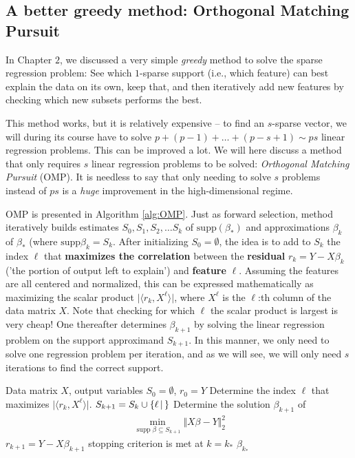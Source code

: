 \documentclass{article}
\DeclareMathOperator{\supp}{\mathrm{supp}}
\newcommand{\sprod}[1]{\langle #1 \rangle}
\newcommand{\sse}{\subseteq}
\newcommand{\set}[2]{\{ #1 \, \vert \, #2\}}
\newcommand{\abs}[1]{\vert #1 \vert}
\newcommand{\norm}[1]{\Vert #1 \Vert}
\begin{document}
\subsection{A better greedy method: Orthogonal Matching Pursuit}
In Chapter $2$, we discussed a very simple \emph{greedy} method to solve the sparse regression problem: See which $1$-sparse support (i.e., which feature) can best explain the data on its own, keep that, and then iteratively add new features by checking which new subsets performs the best.

This method works, but it is relatively expensive -- to find an $s$-sparse vector, we will during its course have to solve $p+(p-1)+\dots + (p-s+1) \sim ps$ linear regression problems. This can be improved a lot. We will here discuss a method that only requires $s$ linear regression problems to be solved: \emph{Orthogonal Matching Pursuit} (OMP). It is needless to say that only needing to solve $s$ problems instead of $ps$ is a \emph{huge} improvement in the high-dimensional regime.


OMP is presented in Algorithm \ref{alg:OMP}. Just as forward selection, method iteratively builds estimates $S_0,S_1,S_2, \dots S_k$ of $\mathrm{supp }(\beta_*)$ and approximations $\beta_k$ of $\beta_*$ (where $\mathrm{supp} \beta_k = S_k$. After initializing $S_0=\emptyset$, the idea is to add to $S_k$ the index  $\ell$ that \textbf{maximizes the correlation} between the \textbf{residual} $r_k=Y-X\beta_k$ ('the portion of output left to explain') and \textbf{feature} $\ell$. Assuming the features are all centered and normalized, this can be expressed mathematically as maximizing the scalar product $\abs{\sprod{r_k,X^\ell}}$, where $X^\ell$ is the $\ell$:th column of the data matrix $X$. Note that checking for which $\ell$ the scalar product is largest is very cheap! One thereafter determines $\beta_{k+1}$ by solving the linear regression problem on the support approximand $S_{k+1}$. In this manner, we only need to solve one regression problem per iteration, and as we will see, we will only need $s$ iterations to find the correct support. 

\begin{algorithm}[tb]      
	\caption{(OMP)} 
	\label{alg:OMP}
	\begin{algorithmic} [1]
 		\REQUIRE Data matrix $X$,  output variables
 		\STATE $S_0=\emptyset$, $r_0 = Y$
 		\REPEAT
 			\STATE Determine the index $\ell$ that maximizes $\abs{\sprod{r_k, X^\ell}}$.
            \STATE $S_{k+1} = S_k \cup \set{\ell}$
            \STATE Determine the solution $\beta_{k+1}$ of 
            \begin{align}
                \min_{\supp \beta \sse S_{k+1}} \norm{X\beta - Y}_2^2 \label{eq:ompprob}
            \end{align}
            \STATE $r_{k+1} = Y-X\beta_{k+1}$
 		\UNTIL stopping criterion is met at $k= k_*$
 		\RETURN $\beta_{k_*}$
	\end{algorithmic}
\end{algorithm}
\end{document}
